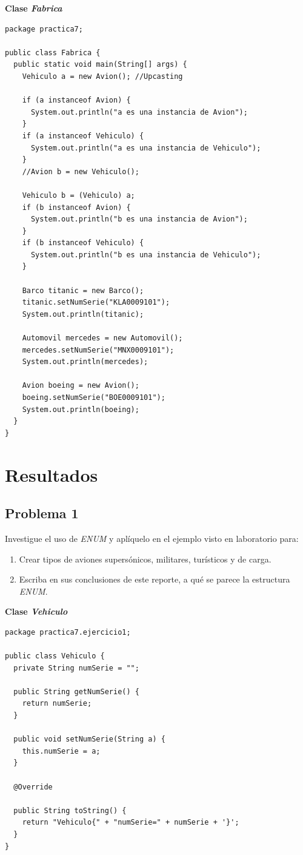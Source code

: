 \documentclass[11pt, twocolumn]{article}
\newcommand{\linejump}{\hfill \break}
\begin{document}
  \textbf{Clase \textit{Fabrica}}
  \begin{lstlisting}
package practica7;

public class Fabrica {
  public static void main(String[] args) {
    Vehiculo a = new Avion(); //Upcasting
    
    if (a instanceof Avion) {
      System.out.println("a es una instancia de Avion");
    }
    if (a instanceof Vehiculo) {
      System.out.println("a es una instancia de Vehiculo");
    }
    //Avion b = new Vehiculo();

    Vehiculo b = (Vehiculo) a;
    if (b instanceof Avion) {
      System.out.println("b es una instancia de Avion");
    }
    if (b instanceof Vehiculo) {
      System.out.println("b es una instancia de Vehiculo");
    }

    Barco titanic = new Barco();
    titanic.setNumSerie("KLA0009101");
    System.out.println(titanic);

    Automovil mercedes = new Automovil();
    mercedes.setNumSerie("MNX0009101");
    System.out.println(mercedes);

    Avion boeing = new Avion();
    boeing.setNumSerie("BOE0009101");
    System.out.println(boeing);
  }
}
  \end{lstlisting}

  \section*{Resultados}
  \subsection*{Problema 1}
  Investigue el uso de \textit{ENUM} y aplíquelo en el ejemplo visto en laboratorio para:
  \begin{enumerate}[label=\alph*.]
    \item Crear tipos de aviones supersónicos, militares, turísticos y de carga.
    \item Escriba en sus conclusiones de este reporte, a qué se parece la estructura \textit{ENUM}.
  \end{enumerate}

  \linejump
  \textbf{Clase \textit{Vehiculo}}
  \begin{lstlisting}
package practica7.ejercicio1;

public class Vehiculo {
  private String numSerie = "";

  public String getNumSerie() {
    return numSerie;
  }

  public void setNumSerie(String a) {
    this.numSerie = a;
  }

  @Override

  public String toString() {
    return "Vehiculo{" + "numSerie=" + numSerie + '}';
  }
}
  \end{lstlisting}
\end{document}
